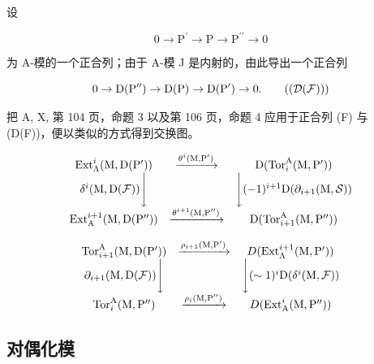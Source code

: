 设

\[
0 \to \mathrm{P} ^ {\prime} \to \mathrm{P} \to \mathrm{P} ^ {\prime \prime} \to 0\tag{F}
\]

为 A-模的一个正合列；由于 A-模 J 是内射的，由此导出一个正合列

\[
0 \to \mathrm{D} (\mathrm{P} ^ {\prime \prime}) \to \mathrm{D} (\mathrm{P}) \to \mathrm{D} (\mathrm{P} ^ {\prime}) \to 0.\tag{\(\left(\mathcal{D}(\mathcal{F})\right)\)}
\]

把 A, X, 第 104 页，命题 3 以及第 106 页，命题 4 应用于正合列 (F) 与 (D(F))，便以类似的方式得到交换图。

\[
\begin{array}{c c c} \operatorname{Ext} _ {\Lambda} ^ {i} (\mathrm{M}, \mathrm{D} (\mathrm{P} ^ {\prime})) & \xrightarrow {\theta^ {i} (\mathrm{M} , \mathrm{P} ^ {\prime})} & \mathrm{D} (\operatorname{Tor} _ {i} ^ {\mathrm{A}} (\mathrm{M}, \mathrm{P} ^ {\prime})) \\ \delta^ {i} (\mathrm{M}, \mathrm{D} (\mathcal {F})) \Bigg \downarrow & & \Bigg \downarrow (- 1) ^ {i + 1} \mathrm{D} (\partial_ {i + 1} (\mathrm{M}, \mathcal {S})) \\ \operatorname{Ext} _ {\mathrm{A}} ^ {i + 1} (\mathrm{M}, \mathrm{D} (\mathrm{P} ^ {\prime \prime})) & \xrightarrow {\theta^ {i + 1} (\mathrm{M} , \mathrm{P} ^ {\prime \prime})} & \mathrm{D} (\operatorname{Tor} _ {i + 1} ^ {\mathrm{A}} (\mathrm{M}, \mathrm{P} ^ {\prime \prime})) \end{array}
\]

\[
\begin{array}{c c c} \operatorname{Tor} _ {i + 1} ^ {\mathrm{A}} (\mathrm{M}, \mathrm{D} (\mathrm{P} ^ {\prime})) & \xrightarrow {\rho_ {i + 1} (\mathrm{M} , \mathrm{P} ^ {\prime})} & D (\operatorname{Ext} _ {\Lambda} ^ {i + 1} (\mathrm{M}, \mathrm{P} ^ {\prime})) \\ \partial_ {i + 1} (\mathrm{M}, \mathrm{D} (\mathcal {F})) \Bigg \downarrow & & \Bigg \downarrow (\sim 1) ^ {i} \mathrm{D} (\delta^ {i} (\mathrm{M}, \mathcal {F})) \\ \operatorname{Tor} _ {i} ^ {\mathrm{A}} (\mathrm{M}, \mathrm{P} ^ {\prime \prime}) & \xrightarrow {\rho_ {i} (\mathrm{M} , \mathrm{P} ^ {\prime \prime})} & D (\operatorname{Ext} _ {\mathrm{A}} ^ {i} (\mathrm{M}, \mathrm{P} ^ {\prime \prime})) \end{array}
\]

\subsection{对偶化模}

